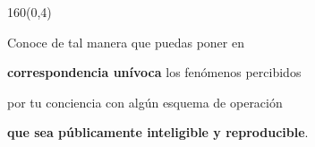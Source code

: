 \documentclass[shownotes,aspectratio=169]{beamer}
\newif\ifen
\newif\ifes
\newcommand{\en}[1]{\ifen#1\fi}
\newcommand{\es}[1]{\ifes#1\fi}
\begin{document}
\begin{frame}[plain]
 \begin{textblock}{160}(0,4)
 \centering \LARGE
 \en{Data as emprirical functions}
 \es{Los datos como funciones empíricas}
\end{textblock}
\vspace{0.75cm}

\pause

 \begin{mdframed}[backgroundcolor=black!20]
 \centering
  Conoce de tal manera que puedas poner en
  
\textbf{correspondencia un\'ivoca} los fenómenos percibidos

por tu conciencia con algún esquema de operación

\textbf{que sea públicamente inteligible y reproducible}.
 \end{mdframed}
\end{frame}
\end{document}
